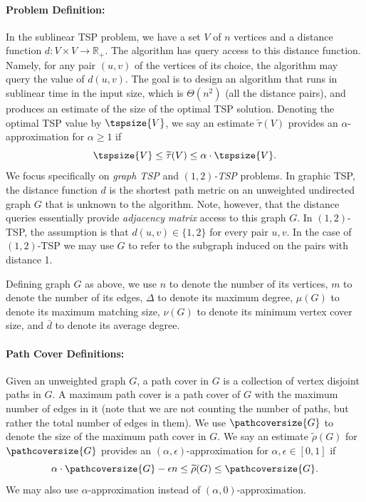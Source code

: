 \paragraph{Problem Definition:} In the sublinear TSP problem, we have a set $V$ of $n$ vertices and a distance function $d: V \times V \to \mathbb{R}_+$. The algorithm has query access to this distance function. Namely, for any pair $(u, v)$ of the vertices of its choice, the algorithm may query the value of $d(u, v)$. The goal is to design an algorithm that runs in sublinear time in the input size, which is $\Theta(n^2)$ (all the distance pairs), and produces an estimate of the size of the optimal TSP solution. Denoting the optimal TSP value by $\tspsize{V}$, we say an estimate $\widetilde{\tau}(V)$ provides an $\alpha$-approximation for $\alpha \geq 1$ if
$$
    \tspsize{V} \leq \widetilde{\tau}(V) \leq \alpha \cdot \tspsize{V}.
$$
We focus specifically on {\em graph TSP} and {\em $(1,2)$-TSP} problems. In graphic TSP, the distance function $d$ is the shortest path metric on an unweighted undirected graph $G$ that is unknown to the algorithm. Note, however, that the distance queries essentially provide {\em adjacency matrix} access to this graph $G$. In $(1,2)$-TSP, the assumption is that $d(u, v) \in \{1,2\}$ for every pair $u, v$. In the case of $(1,2)$-TSP we may use $G$ to refer to the subgraph induced on the pairs with distance 1.

Defining graph $G$ as above, we use $n$ to denote the number of its vertices, $m$ to denote the number of its edges, $\Delta$ to denote its maximum degree, $\mu(G)$ to denote its maximum matching size, $\nu(G)$ to denote its minimum vertex cover size, and $\bar{d}$ to denote its average degree.

\paragraph{Path Cover Definitions:} Given an unweighted graph $G$, a path cover in $G$ is a collection of vertex disjoint paths in $G$. A maximum path cover is a path cover of $G$ with the maximum number of edges in it (note that we are not counting the number of paths, but rather the total number of edges in them). We use $\pathcoversize{G}$ to denote the size of the maximum path cover in $G$. We say an estimate $\widetilde{\rho}(G)$ for $\pathcoversize{G}$ provides an $(\alpha, \epsilon)$-approximation for $\alpha, \epsilon \in [0, 1]$ if
$$
    \alpha \cdot \pathcoversize{G} - \epsilon n \leq \widetilde{\rho}(G) \leq \pathcoversize{G}.
$$
We may also use $\alpha$-approximation instead of $(\alpha, 0)$-approximation.

